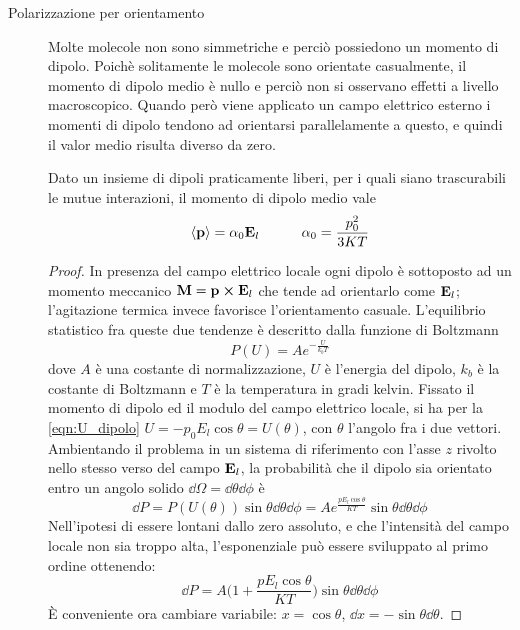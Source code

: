 \begin{description}
    \item[Polarizzazione per orientamento]
        Molte molecole non sono simmetriche e perciò possiedono un momento di dipolo. Poichè solitamente le molecole sono orientate casualmente,
        il momento di dipolo medio è nullo e perciò non si osservano effetti a livello macroscopico.
        Quando però viene applicato un campo elettrico esterno i momenti di dipolo
        tendono ad orientarsi parallelamente a questo, e quindi il valor medio risulta diverso da zero.
        \begin{lemma}
            Dato un insieme di dipoli praticamente liberi, per i quali siano trascurabili le mutue interazioni, il momento di dipolo medio vale
            \begin{equation}
                \expval{\vb{p}}=\alpha_0\vb{E}_l \quad\quad\quad \alpha_0=\frac{p_0^2}{3KT}
            \end{equation}
        \end{lemma}
        \begin{proof}
            In presenza del campo elettrico locale ogni dipolo è sottoposto ad un momento meccanico $\vb{M}=\vb{p}\cp\vb{E}_l$
            che tende ad orientarlo come $\vb{E}_l$; l'agitazione termica invece favorisce l'orientamento casuale.
            L'equilibrio statistico fra queste due tendenze è descritto dalla funzione di Boltzmann
            \[
                P(U) = A e^{-\frac{U}{k_bT}}
            \]
            dove $A$ è una costante di normalizzazione, $U$ è l'energia del dipolo, $k_b$
            è la costante di Boltzmann e $T$ è la temperatura in gradi kelvin.
            Fissato il momento di dipolo ed il modulo del campo elettrico locale, si ha per la \ref{eqn:U_dipolo}
            $U=-p_0E_l\cos\theta=U(\theta)$, con $\theta$ l'angolo fra i due vettori.
            Ambientando il problema in un sistema di riferimento con l'asse $z$ rivolto nello stesso verso del campo $\vb{E}_l$,
            la probabilità che il dipolo sia orientato entro un angolo solido $\dd{\Omega}=\dd{\theta}\dd{\phi}$ è
            \[
                \dd{P}=P(U(\theta))\sin\theta \dd{\theta}\dd{\phi}=A e^{\frac{pE_l\cos\theta}{KT}}\sin\theta \dd{\theta}\dd{\phi}
            \]
            Nell'ipotesi di essere lontani dallo zero assoluto, e che l'intensità del campo locale non sia
            troppo alta, l'esponenziale può essere sviluppato al primo ordine ottenendo:
            \[
                \dd{P}=A \Biggl(1 + \frac{pE_l\cos\theta}{KT}\Biggr) \sin\theta \dd{\theta}\dd{\phi}
            \]
            È conveniente ora cambiare variabile: $x=\cos\theta$, $\dd{x}=-\sin\theta \dd{\theta}$.

\end{proof}
\end{description}
